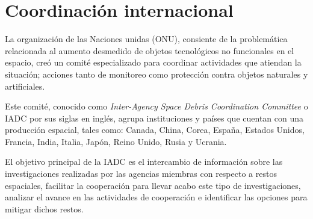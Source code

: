\section*{Coordinación internacional} \label{sec:coordinacion}

La organización de las Naciones unidas (ONU), consiente de la problemática relacionada al aumento desmedido de objetos tecnológicos no funcionales en el espacio, creó un comité especializado para coordinar actividades que atiendan la situación;
acciones tanto de monitoreo como protección contra objetos naturales y artificiales.

Este comité, conocido como  \textit{Inter-Agency Space Debris Coordination Committee} o IADC por sus siglas en inglés, agrupa instituciones y países que cuentan con una producción espacial, tales como: Canada, China, Corea, España, Estados Unidos, Francia, India, Italia, Japón, Reino Unido, Rusia y Ucrania.

El objetivo principal de la IADC\cite{iadc} es el intercambio de información sobre las investigaciones realizadas por las agencias miembras con respecto a restos espaciales,
facilitar la cooperación para llevar acabo este tipo de investigaciones, 
analizar el avance en las actividades de cooperación 
e identificar las opciones para mitigar dichos restos.

